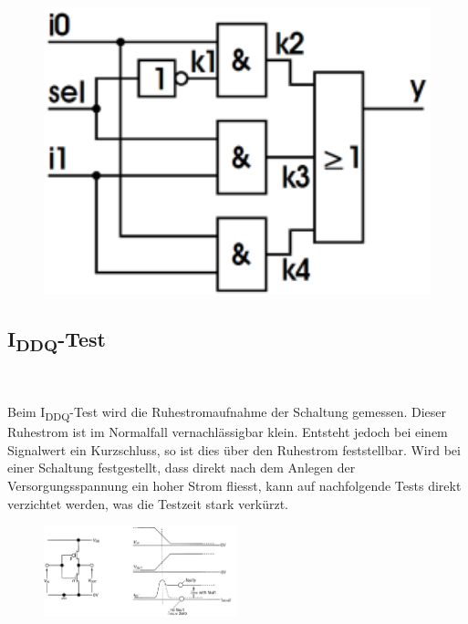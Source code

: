 \begin{minipage}{0.35\textwidth}
\begin{figure}[H]
    \includegraphics[width=1.0\textwidth]{images/stuckat_redundant_schaltung.png}
\end{figure}
\end{minipage}
\subsection{I\textsubscript{DDQ}-Test}$~$ \\
\begin{multicols}{2}
Beim I\textsubscript{DDQ}-Test wird die Ruhestromaufnahme der Schaltung gemessen. Dieser Ruhestrom ist im Normalfall vernachlässigbar klein. Entsteht jedoch bei einem Signalwert ein Kurzschluss, so ist dies über den Ruhestrom feststellbar. Wird bei einer Schaltung festgestellt, dass direkt nach dem Anlegen der Versorgungsspannung ein hoher Strom fliesst, kann auf nachfolgende Tests direkt verzichtet werden, was die Testzeit stark verkürzt.
\begin{figure}[H]
    \includegraphics[width=0.5\textwidth]{images/iddq.png}
\end{figure}
\end{multicols}

